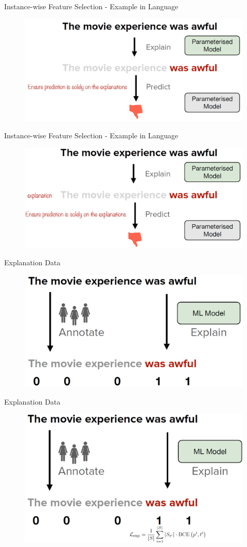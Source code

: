 \documentclass[11pt,compress,t,notes=noshow, aspectratio=169, xcolor=table]{beamer}
\begin{document}
\begin{frame}{Instance-wise Feature Selection - Example in Language}
    \begin{figure}
    \includegraphics[width=0.6\linewidth]{bild11}
    \end{figure}
\end{frame}

\begin{frame}{Instance-wise Feature Selection - Example in Language}
    \begin{figure}
    \includegraphics[width=0.6\linewidth]{bild12}
    \end{figure}
\end{frame}

\begin{frame}{Explanation Data}
    \begin{figure}
    \includegraphics[width=0.6\linewidth]{bild13}
    \end{figure}
\end{frame}

\begin{frame}{Explanation Data}
    \begin{figure}
    \includegraphics[width=0.6\linewidth]{bild14}
    \end{figure}
\end{frame}
\end{document}
